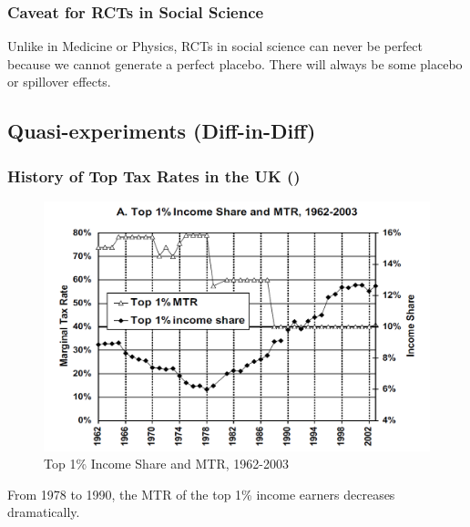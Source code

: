             \subsubsection{Caveat for RCTs in Social Science}

                Unlike in Medicine or Physics, RCTs in social science can never be perfect because we cannot generate a perfect placebo. There will always be some placebo or spillover effects.
                
        \subsection{Quasi-experiments (Diff-in-Diff)}

            \subsubsection{History of Top Tax Rates in the UK (\cite{brewer_means-testing_2010})}

                \begin{figure}[H]
                    \centering
                    \includegraphics[width=4.5in]{images/ch13/13_DID_1.png}
                    \caption{Top 1\% Income Share and MTR, 1962-2003}
                \end{figure}

                From 1978 to 1990, the MTR of the top 1\% income earners decreases dramatically.
                    
